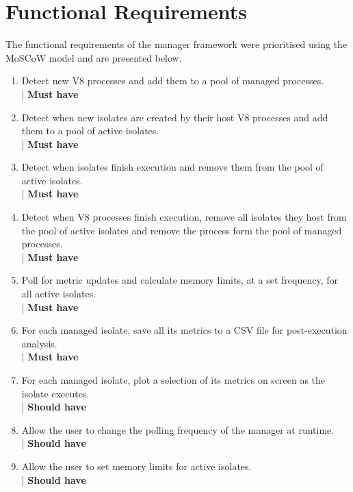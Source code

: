 \documentclass{l4proj}
\begin{document}
\section{Functional Requirements}
\hspace*{1em} The functional requirements of the manager framework were prioritised using the MoSCoW model and are presented below.
\begin{enumerate}
\item Detect new V8 processes and add them to a pool of managed processes. \\| \textbf{Must have}

\item Detect when new isolates are created by their host V8 processes and add them to a pool of active isolates. \\| \textbf{Must have}

\item Detect when isolates finish execution and remove them from the pool of active isolates. \\| \textbf{Must have}

\item Detect when V8 processes finish execution, remove all isolates they host from the pool of active isolates and remove the process form the pool of managed processes. \\| \textbf{Must have}

\item Poll for metric updates and calculate memory limits, at a set frequency, for all active isolates. \\| \textbf{Must have}

\item For each managed isolate, save all its metrics to a CSV file for post-execution analysis. \\| \textbf{Must have}

\item For each managed isolate, plot a selection of its metrics on screen as the isolate executes.\\| \textbf{Should have}

\item Allow the user to change the polling frequency of the manager at runtime.\\| \textbf{Should have}

\item Allow the user to set memory limits for active isolates.\\| \textbf{Should have}


\end{enumerate}
\end{document}
